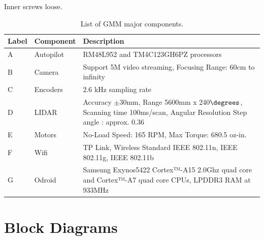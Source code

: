 \documentclass[letterpaper,12pt]{report}
\begin{document}
Inner screws loose.
\begin{table}
\begin{tabular}{| l | p{3cm} | p{10cm} |}
 		\hline
 		Label & Component & Description \\ \hline 
 		A & Autopilot & RM48L952 and TM4C123GH6PZ processors\\ \hline
 		B & Camera & Support 5M video streaming, Focusing Range: 60cm to infinity\\ \hline
 		C & Encoders & 2.6 kHz sampling rate \\ \hline
 		D & LIDAR & Accuracy $\pm$30mm, Range 5600mm x 240$\degrees$, Scanning time 100ms/scan, Angular Resolution Step angle : approx. 0.36\\ \hline
 		E & Motors & No-Load Speed: 165 RPM, Max Torque: 680.5 oz-in.\\ \hline
 		F & Wifi & TP Link, Wireless Standard IEEE 802.11n, IEEE 802.11g, IEEE 802.11b\\ \hline
 		G & Odroid & Samsung Exynos5422 Cortex™-A15 2.0Ghz quad core and Cortex™-A7 quad core CPUs, LPDDR3 RAM at 933MHz \\ \hline
 
	\end{tabular}
	\caption{List of GMM major components.}
\end{table}

\chapter{Block Diagrams}
\end{document}
